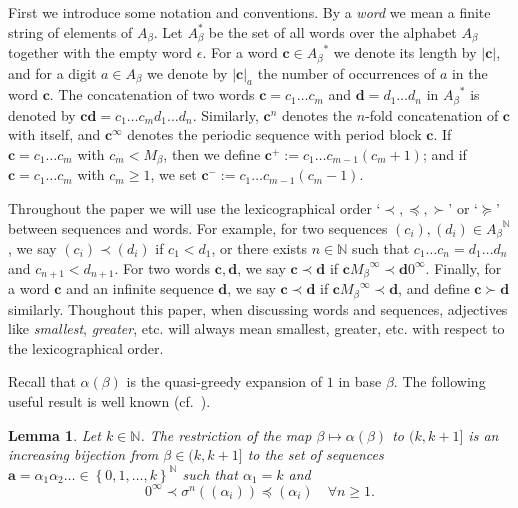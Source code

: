 \documentclass[11pt]{amsart}
\newtheorem{lemma}[theorem]{Lemma}
\theoremstyle{definition}
\theoremstyle{remark}
\numberwithin{equation}{section}
\newcommand{\N}{\ensuremath{\mathbb{N}}}
\renewcommand{\c}{ {\mathbf{c}}}
\renewcommand{\a}{ {\mathbf{a}}}
\newcommand{\set}[1]{\left\{#1\right\}}
\newcommand{\f}{\infty}
\newcommand{\al}{\alpha}
\newcommand{\lle}{\preccurlyeq}
\newcommand{\lge}{\succcurlyeq}
\renewcommand{\a}{ \mathbf{a}}
\newcommand{\si}{\sigma}
\begin{document}
First we introduce some notation and conventions. By a \emph{word} we mean a finite string of {elements of $A_\beta$}. Let {$A_\beta^*$} be the set of all words over the alphabet {$A_\beta$} together with the empty word $\epsilon$. For a word $\c\in{A_\beta}^*$ we denote its length by $|\c|$, and for a digit $a\in{A_\beta}$ we denote by $|\c|_a$ the number of occurrences of $a$ in the word $\c$. The concatenation of two words $\mathbf c=c_1\ldots c_m$ and $\mathbf d=d_1\ldots d_n$ in ${A_\beta}^*$ is denoted by $\mathbf{cd}=c_1\ldots c_md_1\ldots d_n$. Similarly, $\mathbf c^n$ denotes the $n$-fold concatenation of $\mathbf c$ with itself, and $\mathbf c^\f$ denotes the periodic sequence with period block $\mathbf c$. If $\mathbf c=c_1\ldots c_m$ with ${c_m<M_\beta}$, then we define $\mathbf c^+:=c_1\ldots c_{m-1}(c_m+1)$; and if $\mathbf c=c_1\ldots c_m$ with $c_m\geq 1$, we set $\mathbf c^-:=c_1\ldots c_{m-1}{(c_m-1)}$.

Throughout the paper we will use the lexicographical order `$\prec, \lle, \succ$' or `$\lge$' between sequences and words. For example, for two sequences $(c_i), (d_i)\in{A_\beta}^\N$, we say $(c_i)\prec (d_i)$ if $c_1<d_1$, or there exists $n\in\N$ such that $c_1\ldots c_n=d_1\ldots d_n$ and $c_{n+1}<d_{n+1}$. For two words $\mathbf c, \mathbf d$, we say $\mathbf c\prec \mathbf d$ if $\mathbf c {M_\beta}^\f\prec \mathbf d 0^\f$. Finally, for a word $\mathbf{c}$ and an infinite sequence $\mathbf{d}$, we say $\mathbf c\prec \mathbf d$ if $\mathbf c {M_\beta}^\f\prec \mathbf d$, and define $\mathbf c\succ \mathbf d$ similarly. Thoughout this paper, when discussing words and sequences, adjectives like {\em smallest}, {\em greater}, etc. will always mean smallest, greater, etc. with respect to the lexicographical order.

Recall that $\alpha(\beta)$ is the quasi-greedy expansion of $1$ in base $\beta$. The following useful result is well known (cf.~\cite{Baiocchi_Komornik_2007}).

\begin{lemma} \label{lem:quasi-greedy expansion-alpha-q}
{Let $k\in\N$. The restriction of the map $\beta\mapsto\al(\beta)$ to $(k,k+1]$ is an increasing bijection from $\beta\in (k,k+1]$ to the set of sequences $\a=\al_1\al_2\dots\in\set{0,1,\dots,k}^\N$ such that $\al_1=k$ and}
\[
0^\f\prec\si^n((\al_i))\lle (\al_i)\quad\forall n\ge 1.
\]
\end{lemma}
\end{document}
